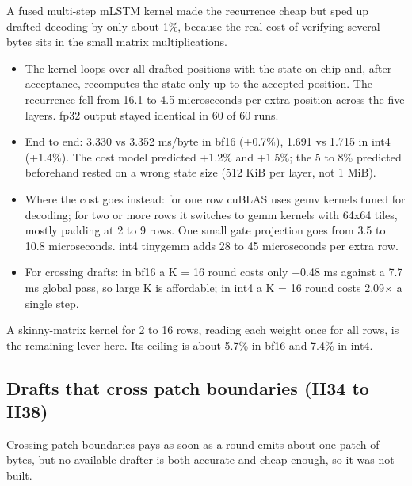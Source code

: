 \documentclass[11pt,a4paper]{article}
\newcommand{\x}{\ensuremath{\times}}
\begin{document}
A fused multi-step mLSTM kernel made the recurrence cheap but sped up drafted decoding by only about 1\%, because the real cost of verifying several bytes sits in the small matrix multiplications.

\begin{itemize}
\item
  The kernel loops over all drafted positions with the state on chip and, after acceptance, recomputes the state only up to the accepted position. The recurrence fell from 16.1 to 4.5 microseconds per extra position across the five layers. fp32 output stayed identical in 60 of 60 runs.
\item
  End to end: 3.330 vs 3.352 ms/byte in bf16 (+0.7\%), 1.691 vs 1.715 in int4 (+1.4\%). The cost model predicted +1.2\% and +1.5\%; the 5 to 8\% predicted beforehand rested on a wrong state size (512 KiB per layer, not 1 MiB).
\item
  Where the cost goes instead: for one row cuBLAS uses gemv kernels tuned for decoding; for two or more rows it switches to gemm kernels with 64x64 tiles, mostly padding at 2 to 9 rows. One small gate projection goes from 3.5 to 10.8 microseconds. int4 tinygemm adds 28 to 45 microseconds per extra row.
\item
  For crossing drafts: in bf16 a K = 16 round costs only +0.48 ms against a 7.7 ms global pass, so large K is affordable; in int4 a K = 16 round costs 2.09\x{} a single step.
\end{itemize}

A skinny-matrix kernel for 2 to 16 rows, reading each weight once for all rows, is the remaining lever here. Its ceiling is about 5.7\% in bf16 and 7.4\% in int4.

\subsection{Drafts that cross patch boundaries (H34 to H38)}\label{drafts-that-cross-patch-boundaries-h34-to-h38}

Crossing patch boundaries pays as soon as a round emits about one patch of bytes, but no available drafter is both accurate and cheap enough, so it was not built.
\end{document}
